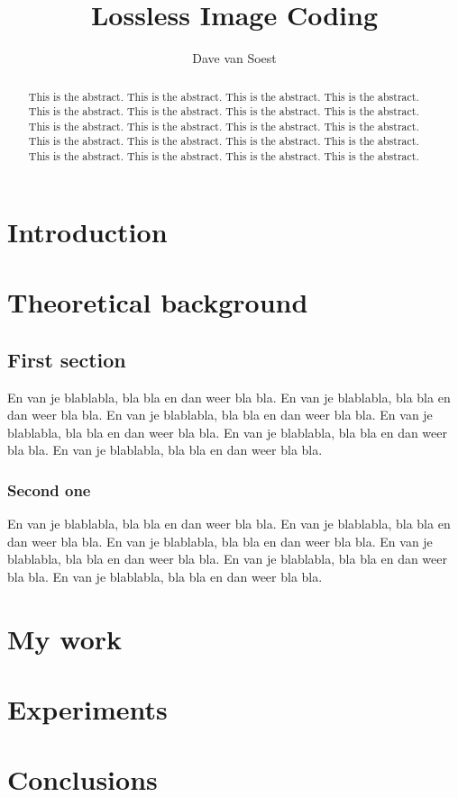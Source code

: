 \documentclass{uva_bachelor_thesis}
\title{Lossless Image Coding}
\author{Dave van Soest}
\begin{document}
\maketitle

\begin{abstract}
This is the abstract. This is the abstract. This is the abstract. This is the abstract. 
This is the abstract. This is the abstract. This is the abstract. This is the abstract. 
This is the abstract. This is the abstract. This is the abstract. This is the abstract. 
This is the abstract. This is the abstract. This is the abstract. This is the abstract. 
This is the abstract. This is the abstract. This is the abstract. This is the abstract. 
\end{abstract}


\tableofcontents

\chapter{Introduction}

\chapter{Theoretical background}

\section{First section}

En van je blablabla, bla bla en dan weer bla bla. En van je blablabla, bla bla en dan weer bla bla. En van je blablabla, bla bla en dan weer bla bla. En van je blablabla, bla bla en dan weer bla bla. En van je blablabla, bla bla en dan weer bla bla. En van je blablabla, bla bla en dan weer bla bla.

\subsection{Second one}

En van je blablabla, bla bla en dan weer bla bla. En van je blablabla, bla bla en dan weer bla bla. En van je blablabla, bla bla en dan weer bla bla. En van je blablabla, bla bla en dan weer bla bla. En van je blablabla, bla bla en dan weer bla bla. En van je blablabla, bla bla en dan weer bla bla.


\chapter{My work}

\chapter{Experiments}

\chapter{Conclusions}
\end{document}
